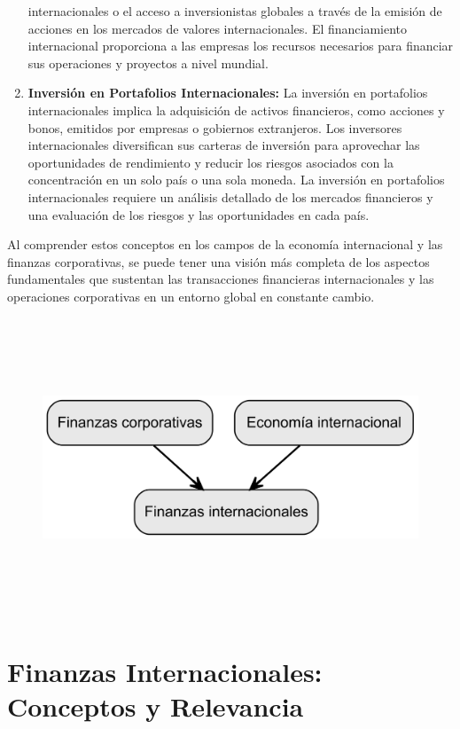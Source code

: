 \documentclass[
  letterpaper,
  DIV=11,
  numbers=noendperiod]{scrartcl}
\begin{document}
\begin{enumerate}
  internacionales o el acceso a inversionistas globales a través de la
  emisión de acciones en los mercados de valores internacionales. El
  financiamiento internacional proporciona a las empresas los recursos
  necesarios para financiar sus operaciones y proyectos a nivel mundial.
\item
  \textbf{Inversión en Portafolios Internacionales:} La inversión en
  portafolios internacionales implica la adquisición de activos
  financieros, como acciones y bonos, emitidos por empresas o gobiernos
  extranjeros. Los inversores internacionales diversifican sus carteras
  de inversión para aprovechar las oportunidades de rendimiento y
  reducir los riesgos asociados con la concentración en un solo país o
  una sola moneda. La inversión en portafolios internacionales requiere
  un análisis detallado de los mercados financieros y una evaluación de
  los riesgos y las oportunidades en cada país.
\end{enumerate}

Al comprender estos conceptos en los campos de la economía internacional
y las finanzas corporativas, se puede tener una visión más completa de
los aspectos fundamentales que sustentan las transacciones financieras
internacionales y las operaciones corporativas en un entorno global en
constante cambio.

\begin{figure}[H]

{\centering \includegraphics[width=5.5in,height=3.5in]{index_files/figure-latex/dot-figure-1.png}

}

\end{figure}

\hypertarget{finanzas-internacionales-conceptos-y-relevancia}{%
\section{Finanzas Internacionales: Conceptos y
Relevancia}\label{finanzas-internacionales-conceptos-y-relevancia}}
\end{document}
